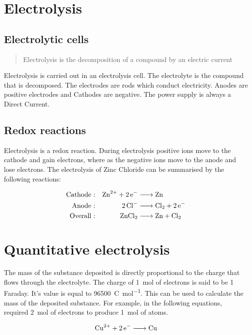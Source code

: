 \documentclass{scrbook}
\begin{document}
\section{Electrolysis}

\subsection{Electrolytic cells}

	\begin{quote}
		Electrolysis is the decomposition of a compound by an electric current
	\end{quote}

	Electrolysis is carried out in an electrolysis cell. The electrolyte is the compound that is decomposed. The electrodes are rods which conduct electricity. Anodes are positive electrodes and Cathodes are negative. The power supply is always a Direct Current.

\subsection{Redox reactions}

	Electrolysis is a redox reaction. During electrolysis positive ions move to the cathode and gain electrons, where as the negative ions move to the anode and lose electrons. The electrolysis of Zinc Chloride can be summarised by the following reactions:

	\begin{align*}
		\text{Cathode :} && \ce{Zn^{2+} + 2e- &-> Zn} \\
		\text{Anode :} && \ce{2Cl- &-> Cl2 + 2e-} \\
		\text{Overall :} && \ce{ZnCl2 &-> Zn + Cl2}
	\end{align*}

\section{Quantitative electrolysis}

	The mass of the substance deposited is directly proportional to the charge that flows through the electrolyte. The charge of \SI{1}{\mole} of electrons is said to be 1 Faraday. It's value is equal to \SI{96500}{\coulomb\per\mole}. This can be used to calculate the mass of the deposited substance. For example, in the following equations,  required \SI{2}{\mole} of electrons to produce \SI{1}{\mole} of  atoms.

	\[ \ce{Cu^{2+} +2e- -> Cu} \]
\end{document}
